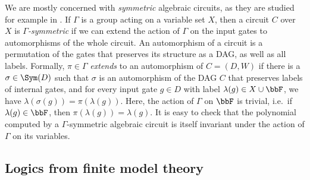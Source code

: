 \documentclass[a4paper,UKenglish,cleveref, autoref, thm-restate]{lipics-v2021}
\begin{document}
	
	We are mostly concerned with \emph{symmetric} algebraic circuits, as they are studied for example in \cite{DawarW20}. If $\Gamma$ is a group acting on a variable set $X$, then a circuit $C$ over $X$ is \emph{$\Gamma$-symmetric} if we can extend the action of $\Gamma$ on the input gates
	to automorphisms of the whole circuit.  An automorphism of a circuit is a permutation of the gates that preserves its structure as a DAG, as well as all labels.
	Formally, $\pi \in \Gamma$ \emph{extends} to an automorphism of $C = (D, W)$ if there is a $\sigma \in \Sym(D)$ such that $\sigma$ is an automorphism of the DAG $C$ that preserves labels of internal gates, and for every input gate $g \in D$ with label $\lambda(g) \in X \cup \bbF$, we have $\lambda(\sigma(g)) = \pi(\lambda(g))$. 
	Here, the action of $\Gamma$ on $\bbF$ is trivial, i.e.\ if $\lambda(g) \in \bbF$, then $\pi(\lambda(g)) = \lambda(g)$.
	It is easy to check that the polynomial computed by a $\Gamma$-symmetric algebraic circuit is itself invariant under the action of $\Gamma$ on its variables.

	
	\subsection{Logics from finite model theory}
	\label{sec:logics}
\end{document}
